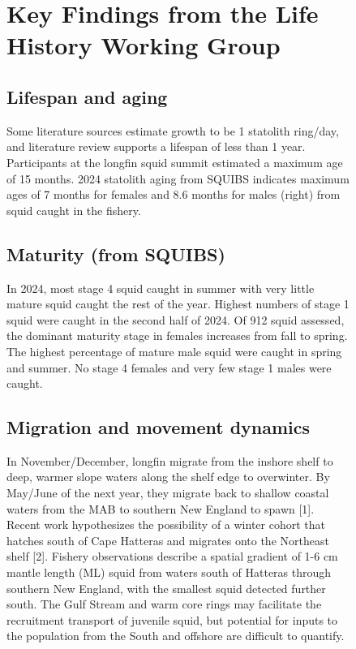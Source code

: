 \documentclass[
  9pt,
  letterpaper,
  DIV=11,
  numbers=noendperiod]{scrartcl}
\begin{document}
\begin{figure}

\begin{minipage}{0.57\linewidth}

\raggedright
\section{Key Findings from the Life History Working Group}

\subsection{Lifespan and aging}

Some literature sources estimate growth to be 1 statolith ring/day, and
literature review supports a lifespan of less than 1 year. Participants
at the longfin squid summit estimated a maximum age of 15 months. 2024
statolith aging from SQUIBS indicates maximum ages of 7 months for
females and 8.6 months for males (right) from squid caught in the
fishery.

\vspace{0.25cm}

\subsection{Maturity (from SQUIBS)}

In 2024, most stage 4 squid caught in summer with very little mature
squid caught the rest of the year. Highest numbers of stage 1 squid were
caught in the second half of 2024. Of 912 squid assessed, the dominant
maturity stage in females increases from fall to spring. The highest
percentage of mature male squid were caught in spring and summer. No
stage 4 females and very few stage 1 males were caught.

\vspace{0.25cm}

\subsection{Migration and movement dynamics}

In November/December, longfin migrate from the inshore shelf to deep,
warmer slope waters along the shelf edge to overwinter. By May/June of
the next year, they migrate back to shallow coastal waters from the MAB
to southern New England to spawn {[}1{]}. Recent work hypothesizes the
possibility of a winter cohort that hatches south of Cape Hatteras and
migrates onto the Northeast shelf {[}2{]}. Fishery observations describe
a spatial gradient of 1-6 cm mantle length (ML) squid from waters south
of Hatteras through southern New England, with the smallest squid
detected further south. The Gulf Stream and warm core rings may
facilitate the recruitment transport of juvenile squid, but potential
for inputs to the population from the South and offshore are difficult
to quantify.


\end{minipage}
\end{figure}
\end{document}
